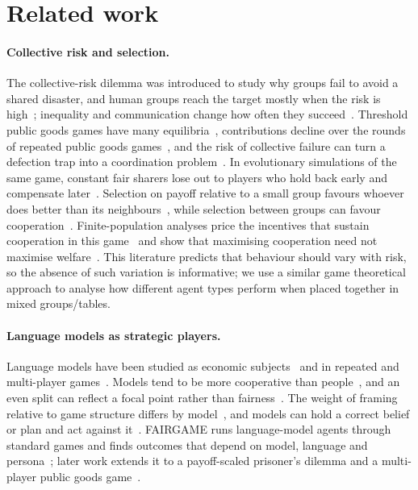 \documentclass[sigconf,anonymous]{aamas}
\begin{document}
\section{Related work}
\label{sec:related}

\paragraph{Collective risk and selection.}
The collective-risk dilemma was introduced to study why groups fail to avoid a shared disaster, and human groups reach the target mostly when the risk is high~\cite{milinski2008collective}; inequality and communication change how often they succeed~\cite{tavoni2011inequality}. Threshold public goods games have many equilibria~\cite{palfrey1984participation}, contributions decline over the rounds of repeated public goods games~\cite{andreoni1988free}, and the risk of collective failure can turn a defection trap into a coordination problem~\cite{santos2011risk,merhej2021cooperation}. In evolutionary simulations of the same game, constant fair sharers lose out to players who hold back early and compensate later~\cite{abouchakra2012evolutionary}. Selection on payoff relative to a small group favours whoever does better than its neighbours~\cite{schaffer1988evolutionarily}, while selection between groups can favour cooperation~\cite{traulsen2006evolution}. Finite-population analyses price the incentives that sustain cooperation in this game~\cite{duong2026cost} and show that maximising cooperation need not maximise welfare~\cite{han2024evolutionary}. This literature predicts that behaviour should vary with risk, so the absence of such variation is informative; we use  a similar game theoretical approach to analyse how different agent types perform when placed together in mixed groups/tables.

\paragraph{Language models as strategic players.}
Language models have been studied as economic subjects~\cite{horton2023large,chen2023emergence,mei2024turing} and in repeated and multi-player  games~\cite{fan2024can,akata2025playing,fontana2024nicer,pal2026large,kempinski2025game,pham2026humans}. Models tend to be more cooperative than people~\cite{mei2024turing}, and an even split can reflect a focal point rather than fairness~\cite{dodivers2025uncovering}. The weight of framing relative to game structure differs by model~\cite{lore2024strategic}, and models can hold a correct belief or plan and act against it~\cite{fan2024can,schmied2026llms}. FAIRGAME runs language-model agents through standard games and finds outcomes that depend on model, language and persona~\cite{buscemi2025fairgame}; later work extends it to a payoff-scaled prisoner's dilemma and a multi-player public goods game~\cite{huynh2025understanding}.
\end{document}
